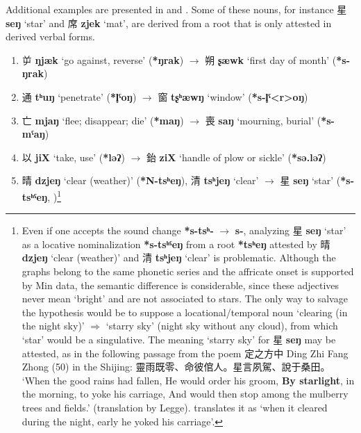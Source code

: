 \documentclass[oneside,a4paper,11pt]{article}
\newcommand{\ipa}[1]{\textbf{{\phon\mbox{#1}}}} %
\newcommand{\zh}[1]{{\cn #1}}
\newcommand{\zhc}[2]{\zh{#1} \ipa{#2}}
\begin{document}
Additional examples are presented in \citet[56]{bs14oc} and \citealt{sagart12sprefix}. Some of these nouns, for instance \zhc{星}{seŋ} `star’ and \zhc{席}{zjek} `mat’, are derived from a root that is only attested in derived verbal forms.

\begin{enumerate}
\item \zhc{屰}{ŋjæk} ‘go against, reverse’ (\ipa{*ŋrak})  $\rightarrow$ \zhc{朔}{ʂæwk} ‘first day of month’  (\ipa{*s-ŋrak})
\item \zhc{通}{tʰuŋ} ‘penetrate’ (\ipa{*l̥ˤoŋ}) $\rightarrow$ \zhc{窗}{tʂʰæwŋ} ‘window’ (\ipa{*s-l̥ˤ<r>oŋ})
\item \zhc{亡}{mjaŋ} ‘flee; disappear; die’ (\ipa{*maŋ}) $\rightarrow$ \zhc{喪}{saŋ} ‘mourning, burial’ (\ipa{*s-mˤaŋ})
\item \zhc{以}{jiX} ‘take, use’ (\ipa{*ləʔ}) $\rightarrow$ \zhc{鈶}{ziX} ‘handle of plow or sickle’ (\ipa{*sə.ləʔ})
\item \zhc{晴}{dzjeŋ} ‘clear (weather)’ (\ipa{*N-tsʰeŋ}), \zhc{清}{tsʰjeŋ} ‘clear'  $\rightarrow$ \zhc{星}{seŋ} `star’ (\ipa{*s-tsʰˤeŋ},  \citealt[139]{bs14oc})\footnote{Even if one accepts the sound change \ipa{*s-tsʰ-} $\rightarrow$ \ipa{s-}, analyzing \zhc{星}{seŋ} `star’ as a locative nominalization \ipa{*s-tsʰˤeŋ} from a root \ipa{*tsʰeŋ} attested by \zhc{晴}{dzjeŋ} ‘clear (weather)’ and \zhc{清}{tsʰjeŋ} ‘clear' is problematic. Although the graphs belong to the same phonetic series and the affricate onset is supported by Min data, the semantic difference is considerable, since these adjectives never mean `bright' and are not associated to stars. The only way to salvage the hypothesis would be to suppose a locational/temporal noun `clearing (in the night sky)' $\Rightarrow$ `starry sky' (night sky without any cloud), from which `star' would be a singulative.
The meaning `starry sky' for \zhc{星}{seŋ} may be attested, as in the following passage from the poem \zh{定之方中} Ding Zhi Fang Zhong (50) in the Shijing: \zh{靈雨既零、命彼倌人。星言夙駕、說于桑田。} `When the good rains had fallen, He would order his groom, \textbf{By starlight}, in the morning, to yoke his carriage, And would then stop among the mulberry trees and fields.' (translation by Legge). \citet[33]{karlgren74odes} translates it as `when it cleared during the night, early he yoked his carriage'. 

}
\end{enumerate}
\end{document}
